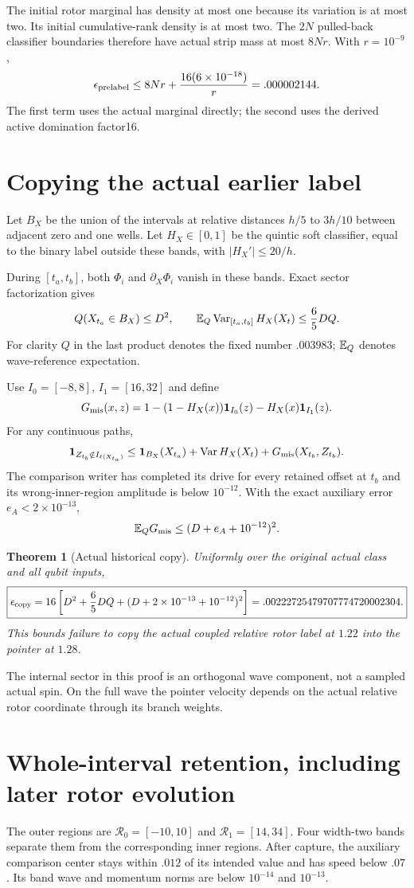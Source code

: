 \documentclass[11pt]{article}
\newtheorem{theorem}{Theorem}[section]
\theoremstyle{definition}\newtheorem{definition}[theorem]{Definition}
\theoremstyle{remark}\newtheorem{remark}[theorem]{Remark}
\newcommand{\one}{\mathbf1}\newcommand{\R}{\mathbb R}\newcommand{\T}{\mathbb T}
\begin{document}
The initial rotor marginal has density at most one because its variation is at most two. Its initial cumulative-rank density is at most two. The $2N$ pulled-back classifier boundaries therefore have actual strip mass at most $8Nr$. With $r=10^{-9}$,
\[
 \epsilon_{\rm prelabel}
 \le8Nr+\frac{16(6\times10^{-18})}{r}
 =.000002144.
\]
The first term uses the actual marginal directly; the second uses the derived active domination factor16.

\section{Copying the actual earlier label}
Let $B_X$ be the union of the intervals at relative distances $h/5$ to $3h/10$ between adjacent zero and one wells. Let $H_X\in[0,1]$ be the quintic soft classifier, equal to the binary label outside these bands, with $|H_X'|\le20/h$.

During $[t_a,t_b]$, both $\Phi_i$ and $\partial_X\Phi_i$ vanish in these bands. Exact sector factorization gives
\[
 Q(X_{t_a}\in B_X)\le D^2,
 \qquad
 \mathbb E_Q\operatorname{Var}_{[t_a,t_b]}H_X(X_t)\le\frac65DQ.
\]
For clarity $Q$ in the last product denotes the fixed number $.003983$; $\mathbb E_Q$ denotes wave-reference expectation.

Use $I_0=[-8,8]$, $I_1=[16,32]$ and define
\[
 G_{\rm mis}(x,z)=1-(1-H_X(x))\one_{I_0}(z)-H_X(x)\one_{I_1}(z).
\]
For any continuous paths,
\[
 \one_{Z_{t_b}\notin I_{\ell(X_{t_a})}}
 \le\one_{B_X}(X_{t_a})+
 \Var H_X(X_t)+G_{\rm mis}(X_{t_b},Z_{t_b}).
\]
The comparison writer has completed its drive for every retained offset at $t_b$ and its wrong-inner-region amplitude is below $10^{-12}$. With the exact auxiliary error $e_A<2\times10^{-13}$,
\[
 \mathbb E_QG_{\rm mis}\le(D+e_A+10^{-12})^2.
\]
\begin{theorem}[Actual historical copy]\label{ph:thm:copy}
Uniformly over the original actual class and all qubit inputs,
\[
 \boxed{\epsilon_{\rm copy}
 =16\left[D^2+\frac65DQ+(D+2\times10^{-13}+10^{-12})^2\right]
 =.00222725479707774720002304.}
\]
This bounds failure to copy the actual coupled relative rotor label at $1.22$ into the pointer at $1.28$.
\end{theorem}
The internal sector in this proof is an orthogonal wave component, not a sampled actual spin. On the full wave the pointer velocity depends on the actual relative rotor coordinate through its branch weights.

\section{Whole-interval retention, including later rotor evolution}
The outer regions are $\mathcal R_0=[-10,10]$ and $\mathcal R_1=[14,34]$. Four width-two bands separate them from the corresponding inner regions. After capture, the auxiliary comparison center stays within $.012$ of its intended value and has speed below $.07$. Its band wave and momentum norms are below $10^{-14}$ and $10^{-13}$.
\end{document}
